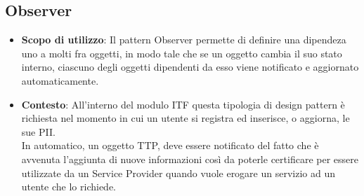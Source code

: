 \subsection{Observer}
\begin{itemize}
	\item \textbf{Scopo di utilizzo}: Il pattern Observer permette di definire una dipendeza uno a molti fra oggetti, in modo tale che se un oggetto cambia il suo stato interno, ciascuno degli oggetti dipendenti da esso viene notificato e aggiornato automaticamente.
	\item \textbf{Contesto}: All'interno del modulo \gls{ITF} questa tipologia di design pattern è richiesta nel momento in cui un utente si registra ed inserisce, o aggiorna, le sue \gls{PII}.\\
	In automatico, un oggetto \gls{TTP}, deve essere notificato del fatto che è avvenuta l'aggiunta di nuove informazioni così da poterle certificare per essere utilizzate da un Service Provider quando vuole erogare un servizio ad un utente che lo richiede.
\end{itemize}